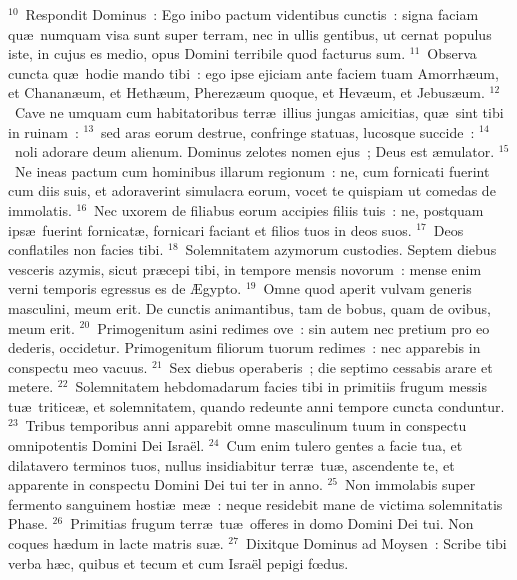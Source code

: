 ${}^{10}$~Respondit Dominus~: Ego inibo pactum videntibus cunctis~: signa faciam qu\ae\ numquam visa sunt super terram, nec in ullis gentibus, ut cernat populus iste, in cujus es medio, opus Domini terribile quod facturus sum.
${}^{11}$~Observa cuncta qu\ae\ hodie mando tibi~: ego ipse ejiciam ante faciem tuam Amorrh\ae um, et Chanan\ae um, et Heth\ae um, Pherez\ae um quoque, et Hev\ae um, et Jebus\ae um.
${}^{12}$~Cave ne umquam cum habitatoribus terr\ae\ illius jungas amicitias, qu\ae\ sint tibi in ruinam~:
${}^{13}$~sed aras eorum destrue, confringe statuas, lucosque succide~:
${}^{14}$~noli adorare deum alienum. Dominus zelotes nomen ejus~; Deus est \ae mulator.
${}^{15}$~Ne ineas pactum cum hominibus illarum regionum~: ne, cum fornicati fuerint cum diis suis, et adoraverint simulacra eorum, vocet te quispiam ut comedas de immolatis.
${}^{16}$~Nec uxorem de filiabus eorum accipies filiis tuis~: ne, postquam ips\ae\ fuerint fornicat\ae , fornicari faciant et filios tuos in deos suos.
${}^{17}$~Deos conflatiles non facies tibi.
${}^{18}$~Solemnitatem azymorum custodies. Septem diebus vesceris azymis, sicut pr\ae cepi tibi, in tempore mensis novorum~: mense enim verni temporis egressus es de \AE gypto.
${}^{19}$~Omne quod aperit vulvam generis masculini, meum erit. De cunctis animantibus, tam de bobus, quam de ovibus, meum erit.
${}^{20}$~Primogenitum asini redimes ove~: sin autem nec pretium pro eo dederis, occidetur. Primogenitum filiorum tuorum redimes~: nec apparebis in conspectu meo vacuus.
${}^{21}$~Sex diebus operaberis~; die septimo cessabis arare et metere.
${}^{22}$~Solemnitatem hebdomadarum facies tibi in primitiis frugum messis tu\ae\ tritice\ae , et solemnitatem, quando redeunte anni tempore cuncta conduntur.
${}^{23}$~Tribus temporibus anni apparebit omne masculinum tuum in conspectu omnipotentis Domini Dei Isra\"el.
${}^{24}$~Cum enim tulero gentes a facie tua, et dilatavero terminos tuos, nullus insidiabitur terr\ae\ tu\ae , ascendente te, et apparente in conspectu Domini Dei tui ter in anno.
${}^{25}$~Non immolabis super fermento sanguinem hosti\ae\ me\ae~: neque residebit mane de victima solemnitatis Phase.
${}^{26}$~Primitias frugum terr\ae\ tu\ae\ offeres in domo Domini Dei tui. Non coques h\ae dum in lacte matris su\ae .
${}^{27}$~Dixitque Dominus ad Moysen~: Scribe tibi verba h\ae c, quibus et tecum et cum Isra\"el pepigi fœdus.



